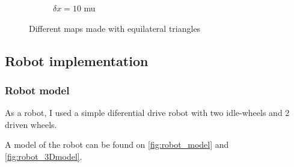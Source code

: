 \documentclass[../main.tex]{subfiles}
\begin{document}
\begin{figure}[H]
\begin{subfigure}{0.3\textwidth}
        \caption{$\delta x = 10$ mu}
    \end{subfigure}
    \caption{Different maps made with equilateral triangles}
    \label{fig:three_map_example}
\end{figure}

\tobedone


\subsection{Robot implementation}

\subsubsection{Robot model}

As a robot, I used a simple diferential drive robot with two idle-wheels and 2 driven wheels.

A model of the robot can be found on \autoref{fig:robot_model} and \autoref{fig:robot_3Dmodel}.
\end{document}

